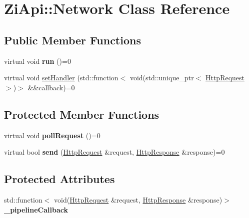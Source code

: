 \hypertarget{classZiApi_1_1Network}{}\section{Zi\+Api\+::Network Class Reference}
\label{classZiApi_1_1Network}
\subsection*{Public Member Functions}
\begin{DoxyCompactItemize}
\item 
\mbox{\label{classZiApi_1_1Network_a0556864740b66ea8085ab8a03a260267}} 
virtual void {\bfseries run} ()=0
\item 
virtual void \mbox{\hyperlink{classZiApi_1_1Network_ab7ff3c88d60b8c7665a30886fd4cf473}{set\+Handler}} (std\+::function$<$ void(std\+::unique\+\_\+ptr$<$ \mbox{\hyperlink{classZiApi_1_1HttpRequest}{Http\+Request}} $>$)$>$ \&\&callback)=0
\end{DoxyCompactItemize}
\subsection*{Protected Member Functions}
\begin{DoxyCompactItemize}
\item 
\mbox{\label{classZiApi_1_1Network_a965edba3c55b9c268af44af7f204be66}} 
virtual void {\bfseries poll\+Request} ()=0
\item 
\mbox{\label{classZiApi_1_1Network_ad247b4d8a4c1f6a051f110a23fe334b1}} 
virtual bool {\bfseries send} (\mbox{\hyperlink{classZiApi_1_1HttpRequest}{Http\+Request}} \&request, \mbox{\hyperlink{classZiApi_1_1HttpResponse}{Http\+Response}} \&response)=0
\end{DoxyCompactItemize}
\subsection*{Protected Attributes}
\begin{DoxyCompactItemize}
\item 
\mbox{\label{classZiApi_1_1Network_a5e14335fe363a06db7af63ad9cee63a7}} 
std\+::function$<$ void(\mbox{\hyperlink{classZiApi_1_1HttpRequest}{Http\+Request}} \&request, \mbox{\hyperlink{classZiApi_1_1HttpResponse}{Http\+Response}} \&response)$>$ {\bfseries \+\_\+pipeline\+Callback}
\end{DoxyCompactItemize}


